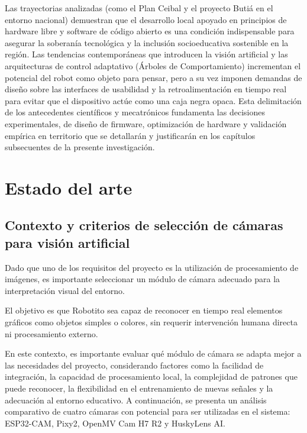 \documentclass{prgrado}
\begin{document}
Las trayectorias analizadas (como el Plan Ceibal y el proyecto Butiá en el entorno nacional) demuestran que el desarrollo local apoyado en principios de hardware libre y software de código abierto es una condición indispensable para asegurar la soberanía tecnológica y la inclusión socioeducativa sostenible en la región. Las tendencias contemporáneas que introducen la visión artificial y las arquitecturas de control adaptativo (Árboles de Comportamiento) incrementan el potencial del robot como objeto para pensar, pero a su vez imponen demandas de diseño sobre las interfaces de usabilidad y la retroalimentación en tiempo real para evitar que el dispositivo actúe como una caja negra opaca. Esta delimitación de los antecedentes científicos y mecatrónicos fundamenta las decisiones experimentales, de diseño de firmware, optimización de hardware y validación empírica en territorio que se detallarán y justificarán en los capítulos subsecuentes de la presente investigación.



\chapter{Estado del arte}

\section{Contexto y criterios de selección de cámaras para visión artificial}

Dado que uno de los requisitos del proyecto es la utilización de procesamiento de imágenes, es importante seleccionar un módulo de cámara adecuado para la interpretación visual del entorno.

El objetivo es que Robotito sea capaz de reconocer en tiempo real elementos gráficos como objetos simples o colores, sin requerir intervención humana directa ni procesamiento externo.

En este contexto, es importante evaluar qué módulo de cámara se adapta mejor a las necesidades del proyecto, considerando factores como la facilidad de integración, la capacidad de procesamiento local, la complejidad de patrones que puede reconocer, la flexibilidad en el entrenamiento de nuevas señales y la adecuación al entorno educativo. A continuación, se presenta un análisis comparativo de cuatro cámaras con potencial para ser utilizadas en el sistema: ESP32-CAM, Pixy2, OpenMV Cam H7 R2 y HuskyLens AI.
\end{document}
